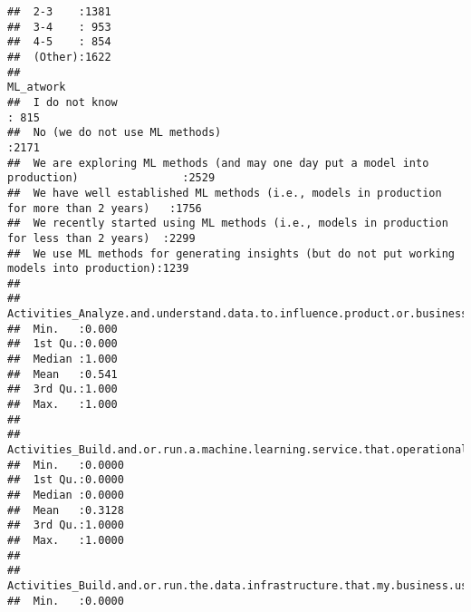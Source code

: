 \documentclass[
]{article}
\begin{document}
\begin{verbatim}
##  2-3    :1381    
##  3-4    : 953    
##  4-5    : 854    
##  (Other):1622    
##                                                                                      ML_atwork   
##  I do not know                                                                            : 815  
##  No (we do not use ML methods)                                                            :2171  
##  We are exploring ML methods (and may one day put a model into production)                :2529  
##  We have well established ML methods (i.e., models in production for more than 2 years)   :1756  
##  We recently started using ML methods (i.e., models in production for less than 2 years)  :2299  
##  We use ML methods for generating insights (but do not put working models into production):1239  
##                                                                                                  
##  Activities_Analyze.and.understand.data.to.influence.product.or.business.decisions
##  Min.   :0.000                                                                    
##  1st Qu.:0.000                                                                    
##  Median :1.000                                                                    
##  Mean   :0.541                                                                    
##  3rd Qu.:1.000                                                                    
##  Max.   :1.000                                                                    
##                                                                                   
##  Activities_Build.and.or.run.a.machine.learning.service.that.operationally.improves.my.product.or.workflows
##  Min.   :0.0000                                                                                            
##  1st Qu.:0.0000                                                                                            
##  Median :0.0000                                                                                            
##  Mean   :0.3128                                                                                            
##  3rd Qu.:1.0000                                                                                            
##  Max.   :1.0000                                                                                            
##                                                                                                            
##  Activities_Build.and.or.run.the.data.infrastructure.that.my.business.uses.for.storing..analyzing..and.operationalizing.data
##  Min.   :0.0000                                                                                                             

\end{verbatim}
\end{document}
